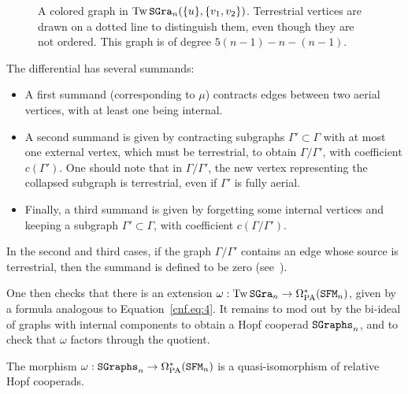\begin{figure}[htbp]
  \centering
  \caption{A colored graph in $\operatorname{Tw} \mathtt{SGra}_{n}(\{u\}, \{v_{1}, v_{2}\})$.
    Terrestrial vertices are drawn on a dotted line to distinguish them, even though they are not ordered.
    This graph is of degree $5(n-1) - n - (n-1)$.}
  \label{cnfbnd.fig.exa-sgra_n}
\end{figure}

The differential has several summands:
\begin{itemize}
\item A first summand (corresponding to $\mu$) contracts edges between two aerial vertices, with at least one being internal.
\item A second summand is given by contracting subgraphs $\Gamma' \subset \Gamma$ with at most one external vertex, which must be terrestrial, to obtain $\Gamma / \Gamma'$, with coefficient $c(\Gamma')$.
  One should note that in $\Gamma/\Gamma'$, the new vertex representing the collapsed subgraph is terrestrial, even if $\Gamma'$ is fully aerial.
\item Finally, a third summand is given by forgetting some internal vertices and keeping a subgraph $\Gamma' \subset \Gamma$, with coefficient $c(\Gamma / \Gamma')$.
\end{itemize}

In the second and third cases, if the graph $\Gamma / \Gamma'$ contains an edge whose source is terrestrial, then the summand is defined to be zero (see~\cite[§6.4.2.2]{Kontsevich2003}).

One then checks that there is an extension $\omega : \operatorname{Tw} \mathtt{SGra}_{n} \to \Omega_{\mathrm{PA}}^{*}(\mathtt{SFM}_{n})$, given by a formula analogous to Equation~\eqref{cnf.eq:4}.
It remains to mod out by the bi-ideal of graphs with internal components to obtain a Hopf cooperad $\mathtt{SGraphs}_{n}$, and to check that $\omega$ factors through the quotient.

\begin{theorem}
  The morphism $\omega : \mathtt{SGraphs}_{n} \to \Omega_{\mathrm{PA}}^{*}(\mathtt{SFM}_{n})$ is a quasi-isomorphism of relative Hopf cooperads.
\end{theorem}

